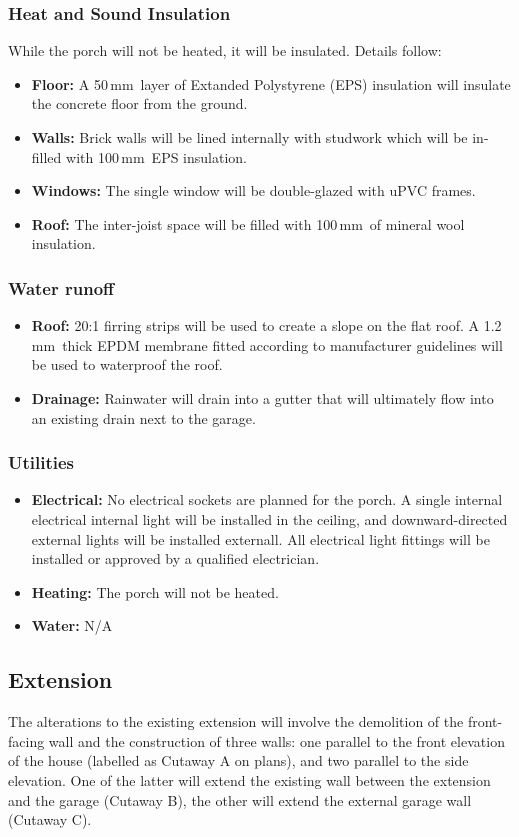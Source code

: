 \documentclass{extension}
\newcommand{\mm}{\,$\mathrm{mm}$}
\begin{document}
\subsubsection{Heat and Sound Insulation}
While the porch will not be heated, it will be insulated. Details follow:
\begin{itemize}
  \item {\bf Floor:} A 50\mm\ layer of Extanded Polystyrene (EPS)\cite{pfins} insulation will insulate the concrete floor from the ground.
  \item {\bf Walls:} Brick walls will be lined internally with studwork which will be in-filled with 100\mm\ EPS insulation.
  \item {\bf Windows:} The single window will be double-glazed with uPVC frames.
  \item {\bf Roof:} The inter-joist space will be filled with 100\mm\ of mineral wool insulation.\cite{prins}
\end{itemize}
\subsubsection{Water runoff}
\begin{itemize}
  \item {\bf Roof:} 20:1 firring strips will be used to create a slope on the flat roof. A 1.2\mm\ thick EPDM membrane\cite{prmem} fitted according to manufacturer guidelines will be used to waterproof the roof.
  \item {\bf Drainage:} Rainwater will drain into a gutter that will ultimately flow into an existing drain next to the garage.
\end{itemize}
\subsubsection{Utilities}
\begin{itemize}
  \item {\bf Electrical:} No electrical sockets are planned for the porch. A single internal electrical internal light will be installed in the ceiling, and downward-directed external lights will be installed externall. All electrical light fittings will be installed or approved by a qualified electrician.
  \item {\bf Heating:} The porch will not be heated.
  \item {\bf Water:} N/A
\end{itemize}

\subsection{Extension}
\label{extension}
The alterations to the existing extension will involve the demolition of the front-facing wall and the construction of three walls: one parallel to the front elevation of the house (labelled as Cutaway A on plans), and two parallel to the side elevation. One of the latter will extend the existing wall between the extension and the garage (Cutaway B), the other will extend the external garage wall (Cutaway C).
\end{document}
